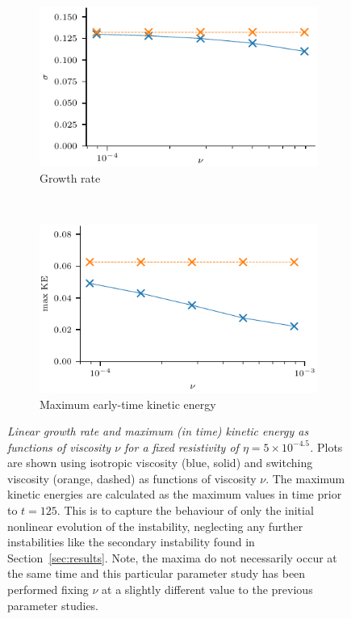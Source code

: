 \begin{figure}[t]
    \centering
    \begin{subfigure}[t]{0.5\textwidth}
      \includegraphics[width=\textwidth]{growth_rate_varying_viscosity.pdf}
      \caption{Growth rate}
    \end{subfigure}%
    ~
    \begin{subfigure}[t]{0.5\textwidth}
      \includegraphics[width=\textwidth]{max_early_time_kinetic_changing_visc.pdf}
      \caption{Maximum early-time kinetic energy}
    \end{subfigure}
    \caption{\textit{Linear growth rate and maximum (in time) kinetic energy as
        functions of viscosity $\nu$ for a fixed
          resistivity of $\eta=5\times10^{-4.5}$.} Plots are shown using isotropic viscosity (blue, solid) and switching viscosity (orange, dashed) as functions of viscosity $\nu$. The maximum kinetic energies are calculated as the maximum values in time prior to $t=125$. This is to capture the behaviour of only the initial nonlinear evolution of the instability, neglecting any further instabilities like the secondary instability found in Section~\ref{sec:results}. Note, the maxima do not necessarily occur at the same time and this particular parameter study has been performed fixing $\nu$ at a slightly different value to the previous parameter studies.}
    \label{fig:growth_rate_varying_viscosity}
\end{figure}

